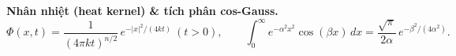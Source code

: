\textbf{Nhân nhiệt (heat kernel) \& tích phân cos-Gauss.}
$$\Phi(x,t)=\frac{1}{(4\pi k t)^{n/2}}\,e^{-|x|^2/(4kt)}\ (t>0),\qquad
\int_0^{\infty} e^{-\alpha^2 x^2}\cos(\beta x)\,dx=\frac{\sqrt{\pi}}{2\alpha}\,e^{-\beta^2/(4\alpha^2)}.$$
